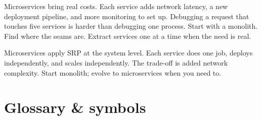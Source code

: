 \documentclass[a4paper,11pt]{article}
\begin{document}
\begin{watchout}
Microservices bring real costs.
Each service adds network latency, a new deployment pipeline, and more monitoring to set up.
Debugging a request that touches five services is harder than debugging one process.
Start with a monolith.
Find where the seams are.
Extract services one at a time when the need is real.
\end{watchout}

\begin{keytake}
Microservices apply SRP at the system level.
Each service does one job, deploys independently, and scales independently.
The trade-off is added network complexity.
Start monolith; evolve to microservices when you need to.
\end{keytake}

\section*{Glossary \& symbols}
\end{document}
